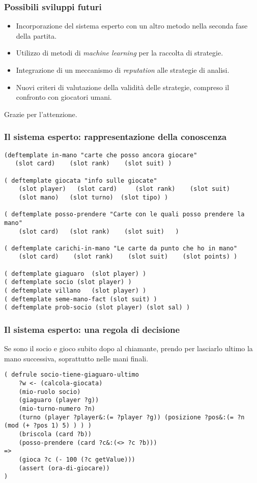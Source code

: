 \documentclass{beamer}
\newcommand*\lista{\item[$\diamondsuit$]}
\begin{document}

\begin{frame}
   \frametitle{Possibili sviluppi futuri}
   \begin{itemize}
      \lista Incorporazione del sistema esperto con un altro metodo nella seconda fase della partita.
      \lista Utilizzo di metodi di \emph{machine learning} per la raccolta di strategie.
      \lista Integrazione di un meccanismo di \emph{reputation} alle strategie di analisi.
      \lista Nuovi criteri di valutazione della validità delle strategie, compreso il confronto con giocatori umani.
   \end{itemize}
   
\end{frame}


\begin{frame}
   \centering
   Grazie per l'attenzione.
\end{frame}

\begin{frame}[fragile]
   \frametitle{Il sistema esperto: rappresentazione della conoscenza}
\begin{lstlisting}
(deftemplate in-mano "carte che posso ancora giocare"
   (slot card)    (slot rank)    (slot suit) )

( deftemplate giocata "info sulle giocate"
    (slot player)	(slot card)		(slot rank)    (slot suit)
    (slot mano)   (slot turno)	(slot tipo) )

( deftemplate posso-prendere "Carte con le quali posso prendere la mano"
    (slot card)   (slot rank)    (slot suit)   )

( deftemplate carichi-in-mano "Le carte da punto che ho in mano"
    (slot card)    (slot rank)    (slot suit)    (slot points) )

( deftemplate giaguaro  (slot player) )
( deftemplate socio (slot player) )
( deftemplate villano   (slot player) )
( deftemplate seme-mano-fact (slot suit) )
( deftemplate prob-socio (slot player) (slot sal) )
\end{lstlisting} 
\end{frame}


\begin{frame}[fragile]
   \frametitle{Il sistema esperto: una regola di decisione}
   Se sono il socio e gioco subito dopo al chiamante, prendo per lasciarlo ultimo la mano successiva, soprattutto nelle mani finali.
\begin{lstlisting}
( defrule socio-tiene-giaguaro-ultimo
    ?w <- (calcola-giocata)
    (mio-ruolo socio)
    (giaguaro (player ?g))
    (mio-turno-numero ?n)
    (turno (player ?player&:(= ?player ?g)) (posizione ?pos&:(= ?n (mod (+ ?pos 1) 5) ) ) )
    (briscola (card ?b))
    (posso-prendere (card ?c&:(<> ?c ?b)))
=>
    (gioca ?c (- 100 (?c getValue)))
    (assert (ora-di-giocare))
)
\end{lstlisting}
\end{frame}
\end{document}
